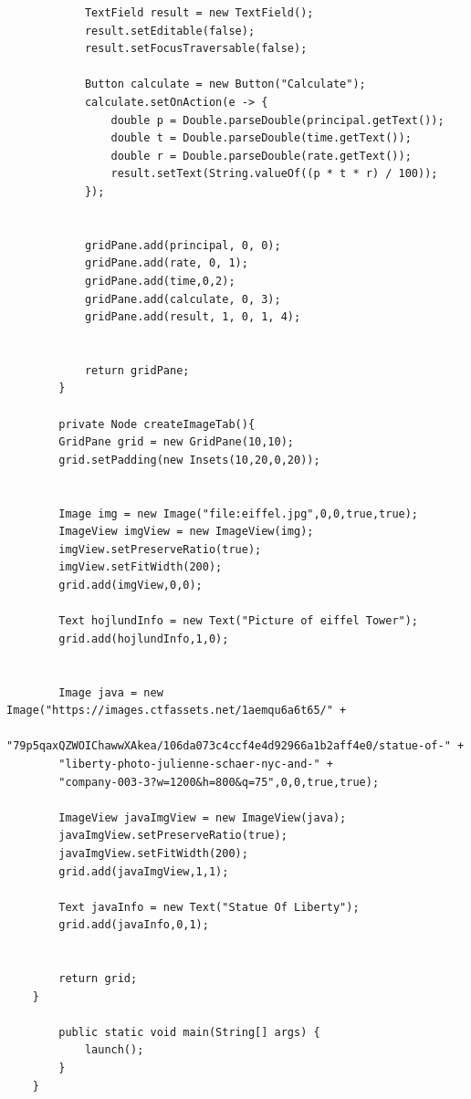 \documentclass{book}
\begin{document}
{\begin{enumerate}
\begin{verbatim}
            TextField result = new TextField();
            result.setEditable(false);
            result.setFocusTraversable(false);

            Button calculate = new Button("Calculate");
            calculate.setOnAction(e -> {
                double p = Double.parseDouble(principal.getText());
                double t = Double.parseDouble(time.getText());
                double r = Double.parseDouble(rate.getText());
                result.setText(String.valueOf((p * t * r) / 100));
            });


            gridPane.add(principal, 0, 0);
            gridPane.add(rate, 0, 1);
            gridPane.add(time,0,2);
            gridPane.add(calculate, 0, 3);
            gridPane.add(result, 1, 0, 1, 4);


            return gridPane;
        }

        private Node createImageTab(){
        GridPane grid = new GridPane(10,10);
        grid.setPadding(new Insets(10,20,0,20));


        Image img = new Image("file:eiffel.jpg",0,0,true,true);
        ImageView imgView = new ImageView(img);
        imgView.setPreserveRatio(true);
        imgView.setFitWidth(200);
        grid.add(imgView,0,0);

        Text hojlundInfo = new Text("Picture of eiffel Tower");
        grid.add(hojlundInfo,1,0);


        Image java = new Image("https://images.ctfassets.net/1aemqu6a6t65/" +
        "79p5qaxQZWOIChawwXAkea/106da073c4ccf4e4d92966a1b2aff4e0/statue-of-" +
        "liberty-photo-julienne-schaer-nyc-and-" +
        "company-003-3?w=1200&h=800&q=75",0,0,true,true);

        ImageView javaImgView = new ImageView(java);
        javaImgView.setPreserveRatio(true);
        javaImgView.setFitWidth(200);
        grid.add(javaImgView,1,1);

        Text javaInfo = new Text("Statue Of Liberty");
        grid.add(javaInfo,0,1);


        return grid;
    }

        public static void main(String[] args) {
            launch();
        }
    }
        

\end{verbatim}
\end{enumerate}}
\end{document}
